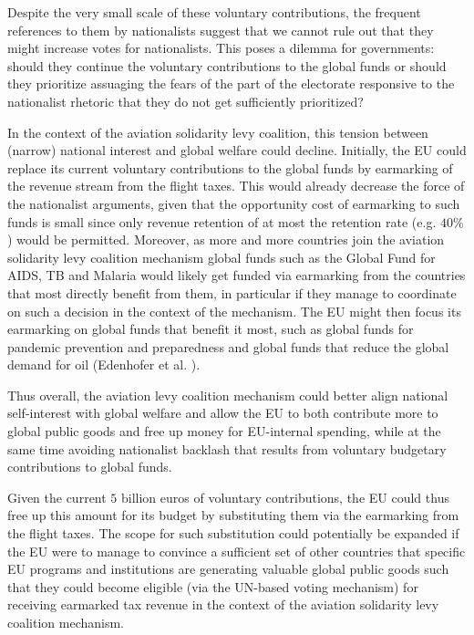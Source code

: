 Despite the very small scale of these voluntary contributions, the frequent references to them by nationalists suggest that we cannot rule out that they might increase votes for nationalists. This poses a dilemma for governments: should they continue the voluntary contributions to the global funds or should they prioritize assuaging the fears of the part of the electorate responsive to the nationalist rhetoric that they do not get sufficiently prioritized?

In the context of the aviation solidarity levy coalition, this tension between (narrow) national interest and global welfare could decline. Initially, the EU could replace its current voluntary contributions to the global funds by earmarking of the revenue stream from the flight taxes. This would already decrease the force of the nationalist arguments, given that the opportunity cost of earmarking to such funds is small since only revenue retention of at most the retention rate (e.g. $40\%$) would be permitted. Moreover, as more and more countries join the aviation solidarity levy coalition mechanism global funds such as the Global Fund for AIDS, TB and Malaria would likely get funded via earmarking from the countries that most directly benefit from them, in particular if they manage to coordinate on such a decision in the context of the mechanism. The EU might then focus its earmarking on global funds that benefit it most, such as global funds for pandemic prevention and preparedness and global funds that reduce the global demand for oil (Edenhofer et al. ).%


Thus overall, the aviation levy coalition mechanism could better align national self-interest with global welfare and allow the EU to both contribute more to global public goods and free up money for EU-internal spending, while at the same time avoiding nationalist backlash that results from voluntary budgetary contributions to global funds.

Given the current $5$ billion euros of voluntary contributions, the EU could thus free up this amount for its budget by substituting them via the earmarking from the flight taxes. The scope for such substitution could potentially be expanded if the EU were to manage to convince a sufficient set of other countries that specific EU programs and institutions are generating valuable global public goods such that they could become eligible (via the UN-based voting mechanism) for receiving earmarked tax revenue in the context of the aviation solidarity levy coalition mechanism.


